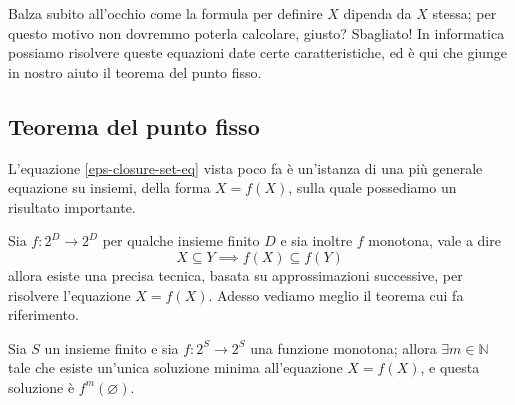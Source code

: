 \documentclass[class=book, crop=false, oneside, 12pt]{standalone}
\begin{document}
Balza subito all'occhio come la formula per definire \(X\) dipenda da \(X\) stessa; per questo motivo non dovremmo poterla calcolare, giusto? 
Sbagliato! In informatica possiamo risolvere queste equazioni date certe caratteristiche, ed è qui che giunge in nostro aiuto il teorema del punto fisso. 


\subsection{Teorema del punto fisso}
L'equazione \ref{eps-closure-set-eq} vista poco fa è un'istanza di una più generale equazione su insiemi, della forma \(X = f(X)\), sulla quale possediamo un risultato importante.


Sia \(f: 2^D \to 2^D\) per qualche insieme finito \(D\) e sia inoltre \( f \) monotona, vale a dire
\begin{equation*}
    X \subseteq Y \implies f(X) \subseteq f(Y)
\end{equation*}
allora esiste una precisa tecnica, basata su approssimazioni successive, per risolvere l'equazione \(X = f(X)\). Adesso vediamo meglio il teorema cui fa riferimento.

\begin{theorem}
    Sia \(S\) un insieme finito e sia \(f: 2^S \to 2^S\) una funzione monotona; allora \(\exists m \in \mathbb{N}\) tale che esiste un'unica soluzione minima all'equazione \(X = f(X)\), e questa soluzione è \(f^m(\varnothing)\).
\end{theorem}
\end{document}
